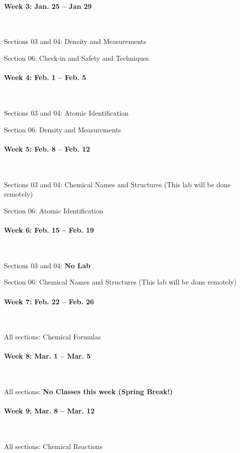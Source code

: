 \documentclass[12pt, letterpaper]{article}
\begin{document}
\paragraph{Week 3:  Jan. 25 -- Jan 29}~

Sections 03 and 04:  Density and Measurements

Section 06: Check-in and Safety and Techniques

\paragraph{Week 4: Feb. 1 -- Feb. 5}~

Sections 03 and 04: Atomic Identification

Section 06: Density and Measurements

\paragraph{Week 5: Feb. 8 -- Feb. 12}~

Sections 03 and 04:  Chemical Names and Structures (This lab will be done remotely)

Section 06: Atomic Identification

\paragraph{Week 6: Feb. 15 -- Feb. 19}~ 

Sections 03 and 04:  \textbf{No Lab}

Section 06: Chemical Names and Structures (This lab will be done remotely)

\paragraph{Week 7: Feb. 22 -- Feb. 26}~

All sections: Chemical Formulas

\paragraph{Week 8: Mar. 1 -- Mar. 5}~ 

All sections: \textbf{No Classes this week (Spring Break!)}

\paragraph{Week 9: Mar. 8 -- Mar. 12}~

All sections: Chemical Reactions
\end{document}
